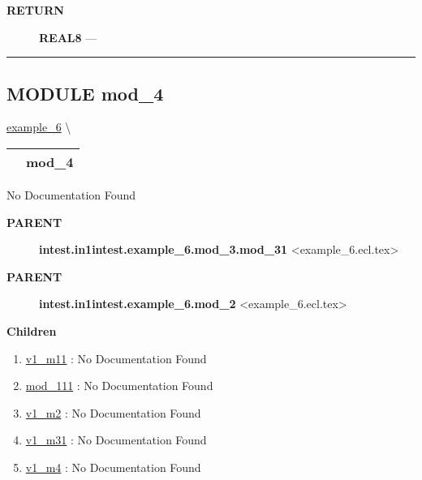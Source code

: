 \par
\begin{description}
\item [\colorbox{tagtype}{\color{white} \textbf{\textsf{RETURN}}}] \textbf{REAL8} --- 
\end{description}




\rule{\linewidth}{0.5pt}




\subsection*{\textsf{\colorbox{headtoc}{\color{white} MODULE}
mod\_4}}

\hypertarget{ecldoc:intest.in1intest.example_6.mod_4}{}
\hspace{0pt} \hyperlink{ecldoc:intest.in1intest.example_6}{example_6} \textbackslash 

{\renewcommand{\arraystretch}{1.5}
\begin{tabularx}{\textwidth}{|>{\raggedright\arraybackslash}l|X|}
\hline
\hspace{0pt}\mytexttt{\color{red} } & \textbf{mod\_4} \\
\hline
\end{tabularx}
}

\par





No Documentation Found










\par
\begin{description}
\item [\colorbox{tagtype}{\color{white} \textbf{\textsf{PARENT}}}] \textbf{intest.in1intest.example\_6.mod\_3.mod\_31} <example\_6.ecl.tex>
\item [\colorbox{tagtype}{\color{white} \textbf{\textsf{PARENT}}}] \textbf{intest.in1intest.example\_6.mod\_2} <example\_6.ecl.tex>
\end{description}


\textbf{Children}
\begin{enumerate}
\item \hyperlink{ecldoc:intest.in1intest.example_6.mod_1.mod_11.v1_m11}{v1\_m11}
: No Documentation Found
\item \hyperlink{ecldoc:intest.in1intest.example_6.mod_1.mod_11.mod_111}{mod\_111}
: No Documentation Found
\item \hyperlink{ecldoc:intest.in1intest.example_6.mod_2.v1_m2}{v1\_m2}
: No Documentation Found
\item \hyperlink{ecldoc:intest.in1intest.example_6.mod_3.mod_31.v1_m31}{v1\_m31}
: No Documentation Found
\item \hyperlink{ecldoc:intest.in1intest.example_6.mod_4.v1_m4}{v1\_m4}
: No Documentation Found
\end{enumerate}

